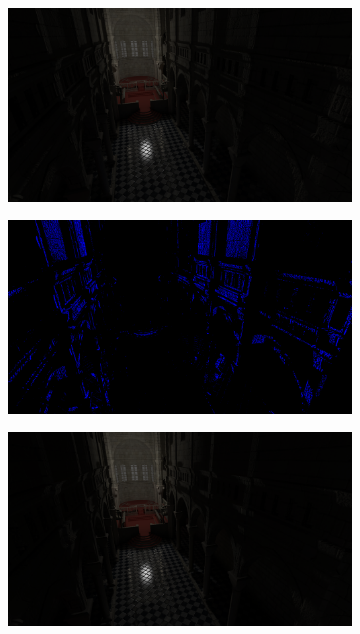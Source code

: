 \begin{figure}[H]
	\centering
	\begin{subfigure}[b]{.49\linewidth}
		\centering
		\captionsetup{justification=centering}
		\includegraphics[width=\linewidth]{media/finals/sibenik_gi_256.png}
	\end{subfigure}%
	\hspace{0.01\textwidth}
	\begin{subfigure}[b]{.49\linewidth}
		\centering
		\captionsetup{justification=centering}
		\includegraphics[width=\linewidth]{media/finals/sibenik_gi_256_diff.png}
	\end{subfigure}%
	\par\smallskip
	\begin{subfigure}[b]{.49\linewidth}
		\centering
		\captionsetup{justification=centering}
		\includegraphics[width=\linewidth]{media/finals/sibenik_gi_128.png}

\end{subfigure}
\end{figure}
